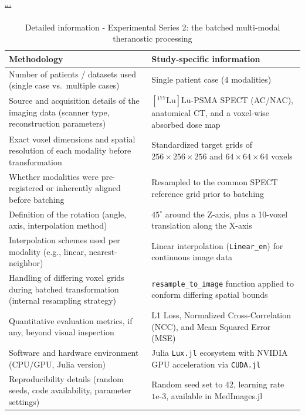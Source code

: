 \documentclass[a4paper,10pt]{article}
\makeatletter
\providecommand{\DIFdeltex}[1]{{\protect\color{red}\sout{#1}}} %
\providecommand{\DIFaddbegin}{} %
\providecommand{\DIFaddend}{} %
\providecommand{\DIFdelend}{} %
\providecommand{\DIFdel}[1]{\texorpdfstring{\DIFdeltex{#1}}{}} %
\providecommand{\DIFaddincludegraphics}[2][]{{\color{blue}\fbox{\DIFOincludegraphics[#1]{#2}}}} %
\DeclareRobustCommand{\DIFaddbegin}{\DIFOaddbegin \let\includegraphics\DIFaddincludegraphics} %
\DeclareRobustCommand{\DIFaddend}{\DIFOaddend \let\includegraphics\DIFOincludegraphics} %
\DeclareRobustCommand{\DIFdelend}{\DIFOaddend \let\includegraphics\DIFOincludegraphics} %
\let\sout@orig\sout %
\renewcommand{\sout}[1]{\ifmmode\text{\sout@orig{\ensuremath{#1}}}\else\sout@orig{#1}\fi} %
\makeatother
\begin{document}
\DIFdel{```
 }\DIFdelend \DIFaddbegin \begin{table}[H]
\centering
\caption{Detailed information - Experimental Series 2: the batched multi-modal theranostic processing}
\label{tab:method_info_batched_Lu177}
\begin{tabular}{|p{}|p{}|}
\hline
\textbf{Methodology} & \textbf{Study-specific information} \\
\hline
Number of patients / datasets used (single case vs.\ multiple cases) & Single patient case (4 modalities) \\
\hline
Source and acquisition details of the imaging data (scanner type, reconstruction parameters) & $[^{177}\text{Lu}]\text{Lu-PSMA}$ SPECT (AC/NAC), anatomical CT, and a voxel-wise absorbed dose map \\
\hline
Exact voxel dimensions and spatial resolution of each modality before transformation & Standardized target grids of $256 \times 256 \times 256$ and $64 \times 64 \times 64$ voxels \\
\hline
Whether modalities were pre-registered or inherently aligned before batching & Resampled to the common SPECT reference grid prior to batching \\
\hline
Definition of the rotation (angle, axis, interpolation method) & $45^\circ$ around the Z-axis, plus a 10-voxel translation along the X-axis \\
\hline
Interpolation schemes used per modality (e.g., linear, nearest-neighbor) & Linear interpolation (\texttt{Linear\_en}) for continuous image data \\
\hline
Handling of differing voxel grids during batched transformation (internal resampling strategy) & \texttt{resample\_to\_image} function applied to conform differing spatial bounds \\
\hline
Quantitative evaluation metrics, if any, beyond visual inspection & L1 Loss, Normalized Cross-Correlation (NCC), and Mean Squared Error (MSE) \\
\hline
Software and hardware environment (CPU/GPU, Julia version) & Julia \texttt{Lux.jl} ecosystem with NVIDIA GPU acceleration via \texttt{CUDA.jl} \\
\hline
Reproducibility details (random seeds, code availability, parameter settings) & Random seed set to 42, learning rate $1\text{e-}3$, available in MedImages.jl \\
\hline
\end{tabular}
\end{table}



 \DIFaddend
\end{document}
